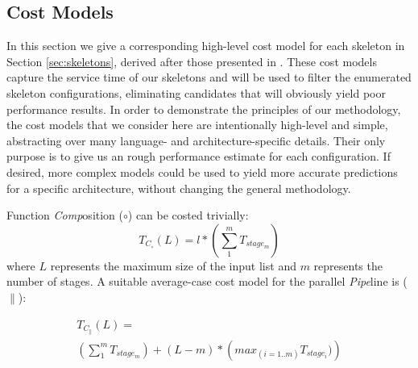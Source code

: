 \documentclass[smallextended]{svjour3}
\begin{document}
\subsection{Cost Models} \label{sec:costmodels}
\noindent
In this section we give a corresponding high-level cost model for each
skeleton in Section \ref{sec:skeletons}, derived after those presented in  \cite{DBLP:books/daglib/0098705,DBLP:conf/europar/CaromelL07}. 
These cost models capture the service time of our skeletons and
will be used to filter the enumerated skeleton configurations, eliminating
candidates that will obviously yield poor performance results.
In order to demonstrate the principles of our methodology, the cost models
that we consider here are intentionally high-level and simple, abstracting over
many language- and architecture-specific details. Their only purpose is to give us
an rough performance estimate for each configuration.
If desired, more complex models could be used to yield more accurate
predictions for a specific architecture,
without changing the general methodology.

\noindent
Function \emph{Comp}osition ($\circ$) can be costed trivially:
\begin{equation}
T_{C_{\circ}}(L) = l * (\sum_{1}^{m}{T_{stage_{m}}})
\end{equation}
where $L$ represents the maximum size of the input list and  $m$ represents the number of stages.
A suitable average-case cost model for the parallel \emph{Pipe}line is ($\parallel$):


\begin{multline}
T_{C_{\parallel}}(L) = \\ ( \sum_{1}^{m}{T_{stage_{m}}}) + (L - m) * \left( max_{(i=1..m)} T_{stage_{i}})\right)
\end{multline}
\end{document}
